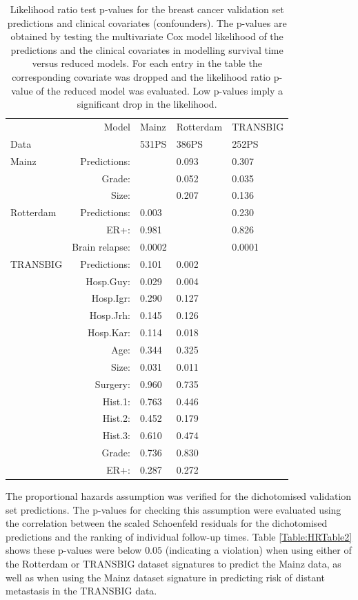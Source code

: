 \documentclass[letterpaper,12pt]{article}
\begin{document}
\begin{table}[h]
\centering
\caption{Likelihood ratio test p-values for the breast cancer validation set predictions and clinical covariates (confounders). The p-values are obtained by testing the multivariate Cox model likelihood of the predictions and the clinical covariates in modelling survival time versus reduced models. For each entry in the table the corresponding covariate was dropped and the likelihood ratio p-value of the reduced model was evaluated. Low p-values imply a significant drop in the likelihood.}
\label{Table:ValIndep2}
\begin{small}
    \begin{tabular}{ | l r | l | l | l |} 
    \hline
     & Model & Mainz & Rotterdam & TRANSBIG \\ Data & & 531PS & 386PS & 252PS \\\hline \hline
    Mainz & Predictions:& & 0.093& 0.307\\ &Grade: & & 0.052& 0.035\\ &Size:& & 0.207& 0.136\\\hline
		Rotterdam  & Predictions:& 0.003& & 0.230\\ &ER+: & 0.981& & 0.826\\ &Brain relapse: & 0.0002& & 0.0001\\\hline
		TRANSBIG  & Predictions:& 0.101& 0.002& \\ & Hosp.Guy: & 0.029& 0.004& \\ & Hosp.Igr: & 0.290& 0.127& \\ & Hosp.Jrh: & 0.145& 0.126& \\ & Hosp.Kar: & 0.114& 0.018& \\ & Age:& 0.344& 0.325& \\ & Size: & 0.031& 0.011& \\ & Surgery: & 0.960& 0.735& \\ & Hist.1: & 0.763& 0.446& \\ & Hist.2: & 0.452& 0.179& \\ & Hist.3: & 0.610& 0.474& \\ & Grade:& 0.736& 0.830& \\ &ER+:& 0.287 & 0.272& \\ \hline
    \end{tabular}
\end{small}
\end{table}


The proportional hazards assumption was verified for the dichotomised validation set predictions. The p-values for checking this assumption were evaluated using the correlation between the scaled Schoenfeld residuals for the dichotomised predictions and the ranking of individual follow-up times. Table \ref{Table:HRTable2} shows these p-values were below $0.05$ (indicating a violation) when using either of the Rotterdam or TRANSBIG dataset signatures to predict the Mainz data, as well as when using the Mainz dataset signature in predicting risk of distant metastasis in the TRANSBIG data.
\end{document}
